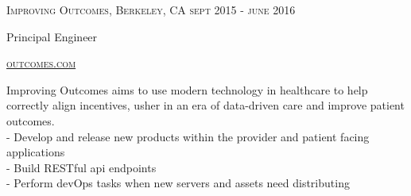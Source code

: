 {
  \textsc{\small{Improving Outcomes, Berkeley, CA
    \hfill
      {\raggedleft
        sept 2015 - june 2016
      } \\
    }
  }
  {\raggedright\large {
      Principal Engineer
  }}

  \textsc{\small\href{http://www.outcomes.com}{outcomes.com}}

  \normalsize{\raggedright
    Improving Outcomes aims to use modern technology in healthcare to help correctly align incentives, usher in an era of data-driven care and improve patient outcomes. \\
    - Develop and release new products within the provider and patient facing applications \\
    - Build RESTful api endpoints \\
    - Perform devOps tasks when new servers and assets need distributing
  }
}
